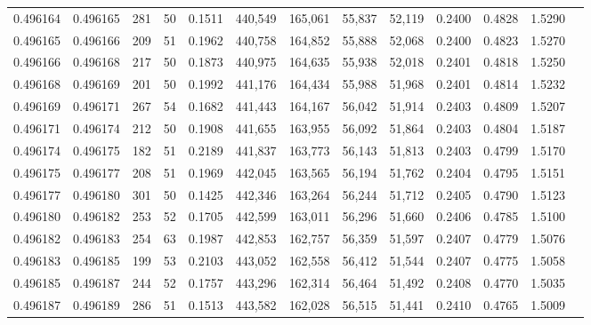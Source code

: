 \begin{tabular}{rrrrrrrrrrrrr}
0.496164 & 0.496165 &   281 &  50 &                                     0.1511 & 440,549 & 165,061 &  55,837 &  52,119 & 0.2400 & 0.4828 & 1.5290 \\
0.496165 & 0.496166 &   209 &  51 &                                     0.1962 & 440,758 & 164,852 &  55,888 &  52,068 & 0.2400 & 0.4823 & 1.5270 \\
0.496166 & 0.496168 &   217 &  50 &                                     0.1873 & 440,975 & 164,635 &  55,938 &  52,018 & 0.2401 & 0.4818 & 1.5250 \\
0.496168 & 0.496169 &   201 &  50 &                                     0.1992 & 441,176 & 164,434 &  55,988 &  51,968 & 0.2401 & 0.4814 & 1.5232 \\
0.496169 & 0.496171 &   267 &  54 &                                     0.1682 & 441,443 & 164,167 &  56,042 &  51,914 & 0.2403 & 0.4809 & 1.5207 \\
0.496171 & 0.496174 &   212 &  50 &                                     0.1908 & 441,655 & 163,955 &  56,092 &  51,864 & 0.2403 & 0.4804 & 1.5187 \\
0.496174 & 0.496175 &   182 &  51 &                                     0.2189 & 441,837 & 163,773 &  56,143 &  51,813 & 0.2403 & 0.4799 & 1.5170 \\
0.496175 & 0.496177 &   208 &  51 &                                     0.1969 & 442,045 & 163,565 &  56,194 &  51,762 & 0.2404 & 0.4795 & 1.5151 \\
0.496177 & 0.496180 &   301 &  50 &                                     0.1425 & 442,346 & 163,264 &  56,244 &  51,712 & 0.2405 & 0.4790 & 1.5123 \\
0.496180 & 0.496182 &   253 &  52 &                                     0.1705 & 442,599 & 163,011 &  56,296 &  51,660 & 0.2406 & 0.4785 & 1.5100 \\
0.496182 & 0.496183 &   254 &  63 &                                     0.1987 & 442,853 & 162,757 &  56,359 &  51,597 & 0.2407 & 0.4779 & 1.5076 \\
0.496183 & 0.496185 &   199 &  53 &                                     0.2103 & 443,052 & 162,558 &  56,412 &  51,544 & 0.2407 & 0.4775 & 1.5058 \\
0.496185 & 0.496187 &   244 &  52 &                                     0.1757 & 443,296 & 162,314 &  56,464 &  51,492 & 0.2408 & 0.4770 & 1.5035 \\
0.496187 & 0.496189 &   286 &  51 &                                     0.1513 & 443,582 & 162,028 &  56,515 &  51,441 & 0.2410 & 0.4765 & 1.5009 \\

\end{tabular}

